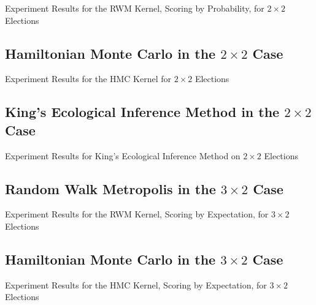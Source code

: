 \begin{table}[ht]
  \centering
  \caption{Experiment Results for the RWM Kernel, Scoring by Probability, for $2 \times 2$ Elections}
  \label{table:rwm_prob_2d}
  
\end{table}


\FloatBarrier
\subsection{Hamiltonian Monte Carlo in the $2 \times 2$ Case}


\begin{table}[ht]
  \centering
  \caption{Experiment Results for the HMC Kernel for $2 \times 2$ Elections}
  \label{table:hmc_2d}
  
\end{table}


\FloatBarrier
\subsection{King's Ecological Inference Method in the $2 \times 2$ Case}


\begin{table}[ht]
  \centering
  \caption{Experiment Results for King's Ecological Inference Method on $2 \times 2$ Elections}
  \label{table:kei_results}
  
\end{table}


\FloatBarrier
\subsection{Random Walk Metropolis in the $3 \times 2$ Case}

\begin{table}[ht]
  \centering
  \caption{Experiment Results for the RWM Kernel, Scoring by Expectation, for $3 \times 2$ Elections}
  \label{table:rwm_3d}
  
\end{table}


\FloatBarrier
\subsection{Hamiltonian Monte Carlo in the $3 \times 2$ Case}


\begin{table}[ht]
  \centering
  \caption{Experiment Results for the HMC Kernel, Scoring by Expectation, for $3 \times 2$ Elections}
  \label{table:hmc_3d}
  
\end{table}


